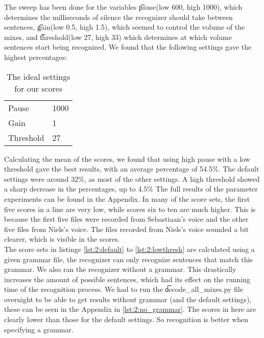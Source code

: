 
The sweep has been done for the variables \t{pause}(low 600, high 1000), which determines the milliseconds of silence the recognizer should take between sentences, \t{gain}(low 0.5, high 1.5), which seemed to control the volume of the mixes, and \t{threshold}(low 27, high 33) which determines at which volume sentences start being recognized. We found that the following settings gave the highest percentages:

\begin{table}[]
\centering
\caption{The ideal settings for our scores}
\label{my-label}
\begin{tabular}{l|l}
Pause     & 1000 \\
Gain      & 1    \\
Threshold & 27  
\end{tabular}
\end{table}

Calculating the mean of the scores, we found that using high pause with a low threshold gave the best results, with an average percentage of 54.5$\%$. The default settings were around 32$\%$, as most of the other settings. A high threshold showed a sharp decrease in the percentages, up to 4.5$\%$ The full results of the parameter experiments can be found in the Appendix. In many of the score sets, the first five scores in a line are very low, while scores six to ten are much higher. This is because the first five files were recorded from Sebastiaan's voice and the other five files from Niels's voice. The files recorded from Niels's voice sounded a bit clearer, which is visible in the scores.\\
The score sets in listings \ref{lst:2:default} to \ref{lst:2:lowthresh} are calculated using a given grammar file, the recognizer can only recognize sentences that match this grammar. We also ran the recognizer without a grammar. This drastically increases the amount of possible sentences, which had its effect on the running time of the recognition process. We had to run the \t{decode_all_mixes.py} file overnight to be able to get results without grammar (and the default settings), these can be seen in the Appendix in \cref{lst:2:no_grammar}. The scores in here are clearly lower than those for the default settings. So recognition is better when specifying a grammar.

